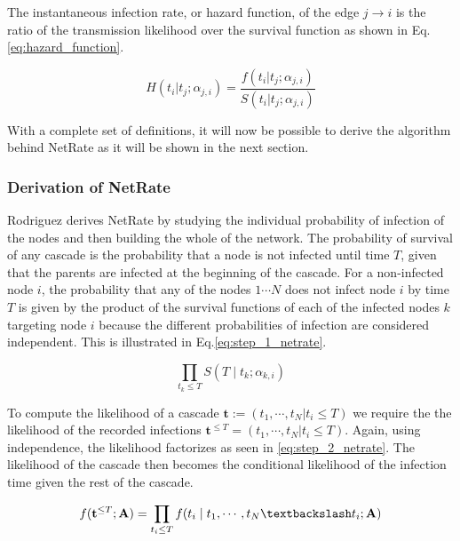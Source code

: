 \documentclass[10pt]{article}
\begin{document}
The instantaneous infection rate, or hazard function, of the edge $j\rightarrow i$ is the ratio of the transmission likelihood over the survival function as shown in Eq.\ref{eq:hazard_function}.

\begin{equation}\label{eq:hazard_function}
H(t_{i}|t_{j};\alpha _{j,i})=\frac{f(t_{i}|t_{j};\alpha _{j,i})}{S(t_{i}|t_{j};\alpha _{j,i})}
\end{equation}

With a complete set of definitions, it will now be possible to derive the algorithm behind NetRate as it will be shown in the next section.

\subsubsection{Derivation of NetRate}

Rodriguez \cite{rodriguez2011uncovering} derives NetRate by studying the individual probability of infection of the nodes and then building the whole of the network. The probability of survival of any cascade is the probability that a node is not infected until time $T$, given that the parents are infected at the beginning of the cascade. For a non-infected node $i$, the probability that any of the nodes $1\cdots N$ does not infect node $i$ by time $T$ is given by the product of the survival functions of each of the infected nodes $k$ targeting node $i$ because the different probabilities of infection are considered independent. This is illustrated in Eq.\ref{eq:step_1_netrate}.

\begin{equation}\label{eq:step_1_netrate}
\prod_{t_{k}\leq T}S(T\mid t_{k};\alpha _{k,i})
\end{equation}

To compute the likelihood of a cascade $\textbf{t}:=(t_{1},\cdots,t_{N}|t_{i}\leq T)$ we require the the likelihood of the recorded infections $\textbf{t}^{\leq T}=(t_{1},\cdots,t_{N}|t_{i}\leq T)$. Again, using independence, the likelihood factorizes as seen in \ref{eq:step_2_netrate}. The likelihood of the cascade then becomes the conditional likelihood of the infection time given the rest of the cascade.

\begin{equation}\label{eq:step_2_netrate}
f(\textbf{t}^{\leq T};\textbf{A})=\prod_{t_{i}\leq T}f(t_{i}\mid t_{1},\cdots,t_{N}\textbackslash t_{i};\textbf{A})
\end{equation}
\end{document}

